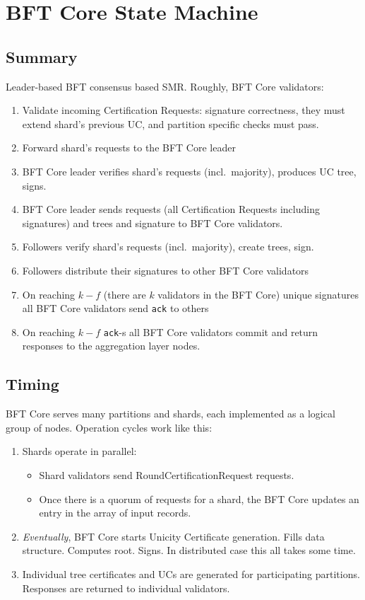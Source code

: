 \chapter{BFT Core State Machine}\label{bft-core}

\section{Summary}\label{summary}

Leader-based BFT consensus based SMR. Roughly, BFT Core validators:

\begin{enumerate}
  \item
    Validate incoming Certification Requests: signature correctness, they must extend shard's previous UC, and partition specific checks must pass.
  \item
    Forward shard's requests to the BFT Core leader
  \item
    BFT Core leader verifies shard's requests (incl.~majority),
    produces UC tree, signs.
  \item
    BFT Core leader sends requests (all Certification Requests including
    signatures) and trees and signature to BFT Core validators.
  \item
    Followers verify shard's requests (incl.~majority), create trees,
    sign.
  \item
    Followers distribute their signatures to other BFT Core validators
  \item
    On reaching $k-f$ (there are $k$ validators in the BFT Core) unique
    signatures all BFT Core validators send \texttt{ack} to others
  \item
    On reaching $k-f$ \texttt{ack}-s all BFT Core validators commit and
    return responses to the aggregation layer nodes.
\end{enumerate}



\section{Timing}

BFT Core serves many partitions and shards, each implemented as a logical group of nodes. Operation cycles work like this:

\begin{enumerate}
  \item Shards operate in parallel:
  \begin{itemize}
    \item Shard validators send RoundCertificationRequest requests.
    \item Once there is a quorum of requests for a shard, the BFT Core updates an entry in the array of input records.
  \end{itemize}
  \item \emph{Eventually}, BFT Core starts Unicity Certificate generation. Fills data structure. Computes root. Signs. In distributed case this all takes some time.
  \item Individual tree certificates and UCs are generated for participating partitions. Responses are returned to individual validators.
\end{enumerate}


